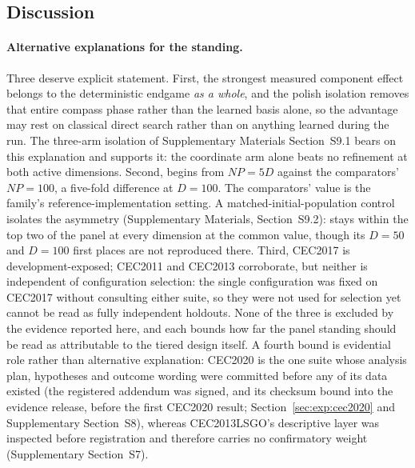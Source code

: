 \subsection{Discussion}\label{sec:exp:discussion}

\paragraph{Alternative explanations for the standing.}
Three deserve explicit statement. First, the strongest measured component
effect belongs to the deterministic endgame \emph{as a whole}, and the polish
isolation removes that entire compass phase rather than the learned basis
alone, so the advantage may rest on classical direct search rather than on
anything learned during the run. The three-arm isolation of Supplementary
Materials Section~S9.1 bears on this explanation and supports it: the coordinate
arm alone beats no refinement at both active dimensions. Second, \dtgsk{} begins from
$NP = 5D$ against the comparators' $NP = 100$, a five-fold difference
at $D = 100$. The comparators' value is the family's
reference-implementation setting. A matched-initial-population control
isolates the asymmetry (Supplementary Materials,
Section~S9.2): \dtgsk{} stays within the top two of the panel at every
dimension at the common value, though its $D = 50$ and $D = 100$ first places
are not reproduced there.
Third, CEC2017 is
development-exposed; CEC2011 and CEC2013 corroborate, but neither is
independent of configuration selection: the single configuration was fixed on
CEC2017 without consulting either suite, so they were not used for selection yet
cannot be read as fully independent holdouts. None of the three is excluded by the
evidence reported here, and each bounds how far the panel standing should be
read as attributable to the tiered design itself. A fourth bound is
evidential role rather than alternative explanation: CEC2020 is the one
suite whose analysis plan, hypotheses and outcome wording were committed
before any of its data existed (the registered addendum was signed, and its
checksum bound into the evidence release, before the first CEC2020 result;
Section~\ref{sec:exp:cec2020} and
Supplementary Section~S8), whereas CEC2013LSGO's descriptive layer was
inspected before registration and therefore carries no confirmatory
weight (Supplementary Section~S7).

